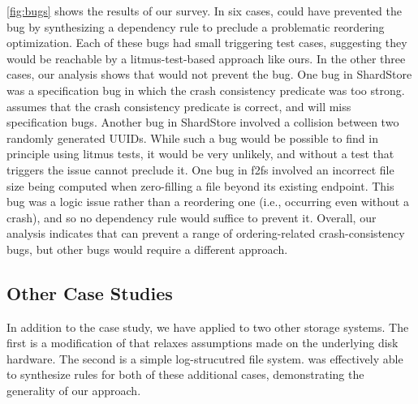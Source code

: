 \cref{fig:bugs} shows the results of our survey.
In six cases, \depsynth could have prevented the bug
by synthesizing a dependency rule to preclude a problematic reordering optimization.
Each of these bugs had small triggering test cases,
suggesting they would be reachable by a litmus-test-based approach like ours.
In the other three cases, our analysis shows that \depsynth would not prevent the bug.
One bug in ShardStore was a specification bug
in which the crash consistency predicate was too strong.
\depsynth assumes that the crash consistency predicate is correct,
and will miss specification bugs.
Another bug in ShardStore involved a collision between two randomly generated UUIDs.
While such a bug would be possible to find in principle using litmus tests,
it would be very unlikely,
and without a test that triggers the issue \depsynth cannot preclude it.
One bug in f2fs involved an incorrect file size being computed when zero-filling a file
beyond its existing endpoint.
This bug was a logic issue rather than a reordering one (i.e., occurring even without a crash),
and so no dependency rule would suffice to prevent it.
Overall, our analysis indicates
that \depsynth can prevent a range of ordering-related crash-consistency bugs,
but other bugs would require a different approach.

\subsection{Other Case Studies}\label{sec:eval:other}
In addition to the \shardstore case study, %
we have applied \depsynth to two other storage systems.
The first is a modification of \shardstore that relaxes assumptions made on the underlying disk hardware.
The second is a simple log-strucutred file system.
\depsynth was effectively able to synthesize rules for both of these
additional cases, demonstrating the generality of our approach.

